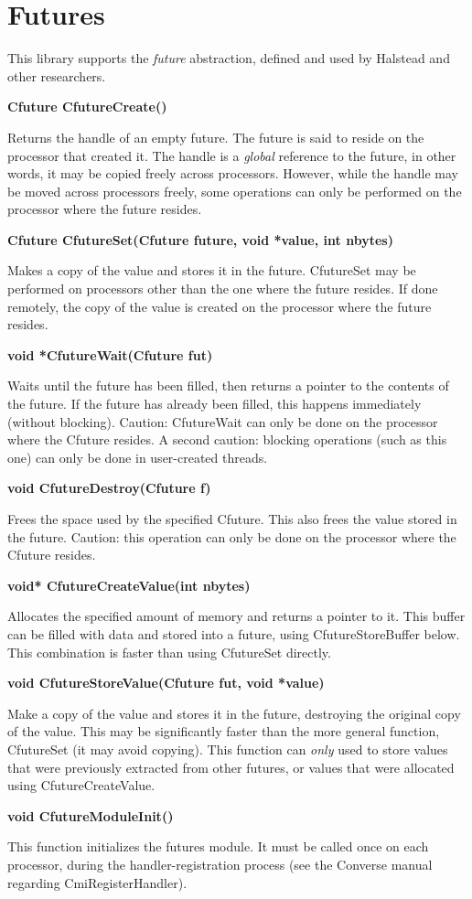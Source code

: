 \chapter{Futures}

This library supports the {\em future} abstraction, defined and used by
Halstead and other researchers.


{\bf Cfuture CfutureCreate()}

Returns the handle of an empty future.  The future is said to reside
on the processor that created it.  The handle is a {\em global}
reference to the future, in other words, it may be copied freely
across processors.  However, while the handle may be moved across
processors freely, some operations can only be performed on the
processor where the future resides.

{\bf Cfuture CfutureSet(Cfuture future, void *value, int nbytes)}

Makes a copy of the value and stores it in the future.  CfutureSet
may be performed on processors other than the one where the future
resides.  If done remotely, the copy of the value is created on the
processor where the future resides.

{\bf void *CfutureWait(Cfuture fut)}

Waits until the future has been filled, then returns a pointer to the
contents of the future.  If the future has already been filled, this
happens immediately (without blocking).  Caution: CfutureWait can only
be done on the processor where the Cfuture resides.  A second caution:
blocking operations (such as this one) can only be done in
user-created threads.

{\bf void CfutureDestroy(Cfuture f)}

Frees the space used by the specified Cfuture.  This also frees the
value stored in the future.  Caution: this operation can only be done
on the processor where the Cfuture resides.

{\bf void* CfutureCreateValue(int nbytes)}

Allocates the specified amount of memory and returns a pointer to it.
This buffer can be filled with data and stored into a future, using
CfutureStoreBuffer below.  This combination is faster than using
CfutureSet directly.

{\bf void CfutureStoreValue(Cfuture fut, void *value)}

Make a copy of the value and stores it in the future, destroying the
original copy of the value.  This may be significantly faster than the
more general function, CfutureSet (it may avoid copying).  This
function can {\em only} used to store values that were previously
extracted from other futures, or values that were allocated using
CfutureCreateValue.

{\bf void CfutureModuleInit()}

This function initializes the futures module.  It must be called once
on each processor, during the handler-registration process (see the
Converse manual regarding CmiRegisterHandler).

